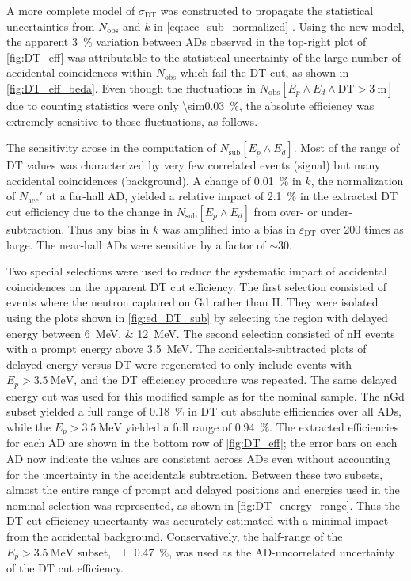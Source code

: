A more complete model of $\sigma_\text{DT}$ was constructed
to propagate the statistical uncertainties
from $N_\text{obs}$ and $k$ in \cref{eq:acc_sub_normalized}
\cite{beda_DT_eff_unc}.
Using the new model, the apparent \SI{3}{\percent} variation between ADs
observed in the top-right plot of \cref{fig:DT_eff}
was attributable to the statistical uncertainty
of the large number of accidental coincidences within $N_\text{obs}$
which fail the DT cut,
as shown in \cref{fig:DT_eff_beda}.
Even though the fluctuations in
$N_\text{obs}[E_p \wedge E_d \wedge \text{DT} > \SI{3}{\m}]$
due to counting statistics were only \SI{\sim0.03}{\percent},
the absolute efficiency was extremely sensitive to those fluctuations, as follows.

The sensitivity arose in the computation of $N_\text{sub}[E_p \wedge E_d]$.
Most of the range of DT values was characterized by
very few correlated events (signal) but many accidental coincidences (background).
A change of \SI{0.01}{\percent} in $k$, the normalization
of $N_\text{acc}'$ at a far-hall AD,
yielded a relative impact of \SI{2.1}{\percent} in the extracted DT cut efficiency
due to the change in $N_\text{sub}[E_p \wedge E_d]$
from over- or under-subtraction.
Thus any bias in $k$ was amplified into a bias in $\varepsilon_\text{DT}$
over 200 times as large.
The near-hall ADs were sensitive by a factor of ${\sim}30$.

Two special selections were used to reduce the systematic impact of accidental coincidences
on the apparent DT cut efficiency.
The first selection consisted of events where the neutron captured on Gd
rather than H.
They were isolated using the plots shown in \cref{fig:ed_DT_sub}
by selecting the region with delayed energy between \SIlist{6;12}{\MeV}.
The second selection consisted of nH events
with a prompt energy above \SI{3.5}{\MeV}.
The accidentals-subtracted plots of delayed energy versus DT were
regenerated to only include events with $E_p > \SI{3.5}{\MeV}$,
and the DT efficiency procedure was repeated.
The same delayed energy cut was used for this modified sample
as for the nominal sample.
The nGd subset yielded a full range of \SI{0.18}{\percent}
in DT cut absolute efficiencies over all ADs,
while the $E_p > \SI{3.5}{\MeV}$ yielded a full range of \SI{0.94}{\percent}.
The extracted efficiencies for each AD are shown in
the bottom row of \cref{fig:DT_eff};
the error bars on each AD now indicate the values are consistent across ADs
even without accounting for the uncertainty in the accidentals subtraction.
Between these two subsets, almost the entire range
of prompt and delayed positions and energies used in the nominal selection was represented,
as shown in \cref{fig:DT_energy_range}.
Thus the DT cut efficiency uncertainty was accurately estimated
with a minimal impact from the accidental background.
Conservatively, the half-range of the $E_p > \SI{3.5}{\MeV}$ subset,
\SI{\pm0.47}{\percent}, was
used as the AD-uncorrelated uncertainty of the DT cut efficiency.

